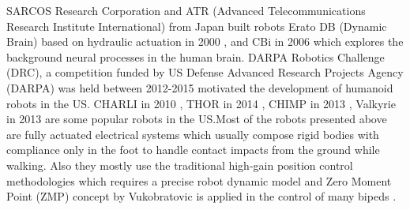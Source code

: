 SARCOS Research Corporation and ATR (Advanced Telecommunications Research Institute International) from Japan built robots Erato DB (Dynamic Brain) based on hydraulic actuation in 2000 \cite{atkeson2000using}, and CBi in 2006 \cite{cheng2007cb} which explores the background neural processes in the human brain. DARPA Robotics Challenge (DRC), a competition funded by US Defense Advanced Research Projects Agency (DARPA)  was held between 2012-2015 motivated the development of humanoid robots in the US.  CHARLI in 2010 \cite{knabe2013team}, THOR in 2014 \cite{yi2015team}, CHIMP in 2013 \cite{stentz2015chimp}, Valkyrie in 2013 \cite{radford2015valkyrie} are some popular robots in the US.Most of the robots presented above are fully actuated electrical systems which usually compose rigid bodies with compliance only in the foot to handle contact impacts from the ground while walking. Also they mostly use the traditional high-gain position control methodologies which requires a precise robot dynamic model and Zero Moment Point (ZMP) concept by Vukobratovic \cite{vukobratovic1972stability} is applied in the control of many bipeds \cite{hirai1998development,Kaneko04humanoidrobot,grey2013multi}. 

